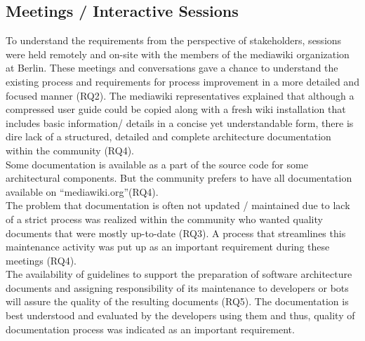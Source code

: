 \subsection{Meetings / Interactive Sessions}
\indent To understand the requirements from the perspective of stakeholders, sessions were held remotely and on-site with the members of the mediawiki organization at Berlin. These meetings and conversations gave a chance to understand the existing process and requirements for process improvement in a more detailed and focused manner (RQ2).
The mediawiki representatives explained that although a compressed user guide could be copied along with a fresh wiki installation that includes basic information/ details in a concise yet understandable form, there is dire lack of a structured, detailed and complete architecture documentation within the community (RQ4). 
\\\indent Some documentation is available as a part of the source code for some architectural components. But the community prefers to have all documentation available on \enquote{mediawiki.org}(RQ4).
\\\indent The problem that documentation is often not updated / maintained due to lack of a strict process was realized within the community who wanted quality documents that were mostly up-to-date (RQ3). A process that streamlines this maintenance activity was put up as an important requirement during these meetings (RQ4). 
\\\indent The availability of guidelines to support the preparation of software architecture documents and assigning responsibility of its maintenance to developers or bots will assure the quality of the resulting documents (RQ5). The documentation is best understood and evaluated by the developers using them and thus, quality of documentation process was indicated as an important requirement.

